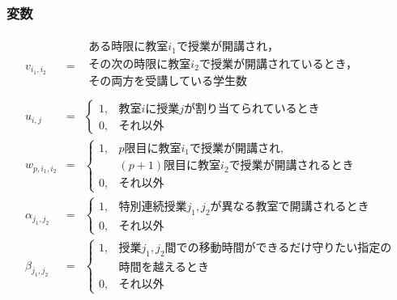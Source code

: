 \documentclass[dvipdfmx,12pt]{beamer}
\begin{document}
\begin{frame}
 \frametitle {\LARGE 変数}
\small{
\[
\begin{array}{rcl}
v_{i_1,i_2} & = & 
\begin{array}{ll}
\mbox{ある時限に教室$i_1$で授業が開講され，}\\
\mbox{その次の時限に教室$i_2$で授業が開講されているとき，}\\
\mbox{その両方を受講している学生数}\\ 
\end{array}
\\


 u_{i,j} & = & \left\{ 
\begin{array}{ll}
1, & \mbox{教室$i$に授業$j$が割り当てられているとき} \\
0, & \mbox{それ以外}
\end{array}
\right. \\


w_{p,i_1,i_2} & = & \left\{ 
\begin{array}{ll}
1, & \mbox{$p$限目に教室$i_1$で授業が開講され,}\\
& \mbox{$(p+1)$限目に教室$i_2$で授業が開講されるとき}\\ 
0, & \mbox{それ以外}
\end{array}
\right.\\

\alpha_{j_1,j_2} & = & \left\{ 
\begin{array}{ll}
1, & \mbox{特別連続授業$j_1,j_2$が異なる教室で開講されるとき}\\
0, & \mbox{それ以外}
\end{array}
\right.\\

\beta_{j_1,j_2} & = & \left\{ 
\begin{array}{ll}
1, & \mbox{授業$j_1,j_2$間での移動時間ができるだけ守りたい指定の}\\
	& \mbox{時間を越えるとき}\\
0, & \mbox{それ以外}
\end{array}
\right.\\

\end{array}
\]
}
\end{frame}
\end{document}
